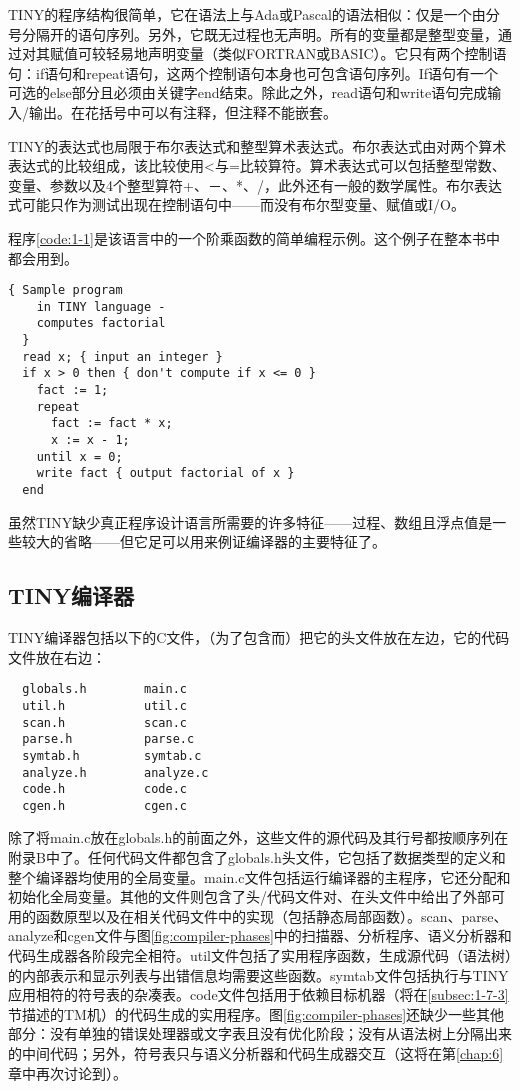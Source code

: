 \documentclass[lang=cn,10pt]{elegantbook}
\begin{document}
TINY的程序结构很简单，它在语法上与Ada或Pascal的语法相似：仅是一个由分号分隔开的语句序列。另外，它既无过程也无声明。所有的变量都是整型变量，通过对其赋值可较轻易地声明变量（类似FORTRAN或BASIC）。它只有两个控制语句：if语句和repeat语句，这两个控制语句本身也可包含语句序列。If语句有一个可选的else部分且必须由关键字end结束。除此之外，read语句和write语句完成输入/输出。在花括号中可以有注释，但注释不能嵌套。

TINY的表达式也局限于布尔表达式和整型算术表达式。布尔表达式由对两个算术表达式的比较组成，该比较使用<与=比较算符。算术表达式可以包括整型常数、变量、参数以及4个整型算符+、－、*、/，此外还有一般的数学属性。布尔表达式可能只作为测试出现在控制语句中——而没有布尔型变量、赋值或I/O。

程序\ref{code:1-1}是该语言中的一个阶乘函数的简单编程示例。这个例子在整本书中都会用到。

\begin{lstlisting}[caption={一个输出其输入阶乘的TINY语言程序},label={code:1-1}]
  { Sample program
    in TINY language -
    computes factorial
  }
  read x; { input an integer }
  if x > 0 then { don't compute if x <= 0 }
    fact := 1;
    repeat
      fact := fact * x;
      x := x - 1;
    until x = 0;
    write fact { output factorial of x }
  end
\end{lstlisting}

虽然TINY缺少真正程序设计语言所需要的许多特征——过程、数组且浮点值是一些较大的省略——但它足可以用来例证编译器的主要特征了。

\subsection{TINY编译器}
\label{subsec:1-7-2}

TINY编译器包括以下的C文件，（为了包含而）把它的头文件放在左边，它的代码文件放在右边：

\begin{lstlisting}
  globals.h        main.c
  util.h           util.c
  scan.h           scan.c
  parse.h          parse.c
  symtab.h         symtab.c
  analyze.h        analyze.c
  code.h           code.c
  cgen.h           cgen.c
\end{lstlisting}

除了将main.c放在globals.h的前面之外，这些文件的源代码及其行号都按顺序列在附录B中了。任何代码文件都包含了globals.h头文件，它包括了数据类型的定义和整个编译器均使用的全局变量。main.c文件包括运行编译器的主程序，它还分配和初始化全局变量。其他的文件则包含了头/代码文件对、在头文件中给出了外部可用的函数原型以及在相关代码文件中的实现（包括静态局部函数）。scan、parse、analyze和cgen文件与图\ref{fig:compiler-phases}中的扫描器、分析程序、语义分析器和代码生成器各阶段完全相符。util文件包括了实用程序函数，生成源代码（语法树）的内部表示和显示列表与出错信息均需要这些函数。symtab文件包括执行与TINY应用相符的符号表的杂凑表。code文件包括用于依赖目标机器（将在\ref{subsec:1-7-3}节描述的TM机）的代码生成的实用程序。图\ref{fig:compiler-phases}还缺少一些其他部分：没有单独的错误处理器或文字表且没有优化阶段；没有从语法树上分隔出来的中间代码；另外，符号表只与语义分析器和代码生成器交互（这将在第\ref{chap:6}章中再次讨论到）。
\end{document}
